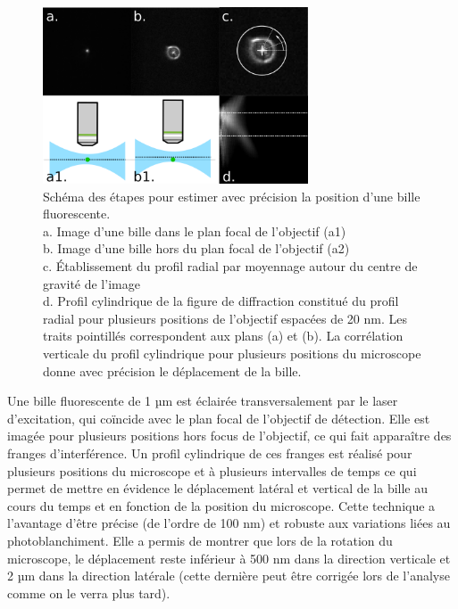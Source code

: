 \begin{figure}
\centering
\includegraphics[width=0.7\textwidth]{./files/bead_position.svg.png}
\caption{Schéma des étapes pour estimer avec précision la position d'une bille fluorescente.\\
a. Image d'une bille dans le plan focal de l'objectif (a1)\\
b. Image d'une bille hors du plan focal de l'objectif (a2)\\
c. Établissement du profil radial par moyennage autour du centre de gravité de l'image\\
d. Profil cylindrique de la figure de diffraction constitué du profil radial pour plusieurs positions de l'objectif espacées de 20 nm. Les traits pointillés correspondent aux plans (a) et (b). La corrélation verticale du profil cylindrique pour plusieurs positions du microscope donne avec précision le déplacement de la bille.
\label{FIGbeadstability}}
\end{figure}

Une bille fluorescente de 1 µm est éclairée transversalement par le laser d'excitation, qui coïncide avec le plan focal de l'objectif de détection. Elle est imagée pour plusieurs positions hors focus de l'objectif, ce qui fait apparaître des franges d'interférence. Un profil cylindrique de ces franges est réalisé pour plusieurs positions du microscope et à plusieurs intervalles de temps ce qui permet de mettre en évidence le déplacement latéral et vertical de la bille au cours du temps et en fonction de la position du microscope. Cette technique a l'avantage d'être précise (de l'ordre de 100 nm) et robuste aux variations liées au photoblanchiment. Elle a permis de montrer que lors de la rotation du microscope, le déplacement reste inférieur à 500 nm dans la direction verticale et 2 µm dans la direction latérale (cette dernière peut être corrigée lors de l'analyse comme on le verra plus tard).

